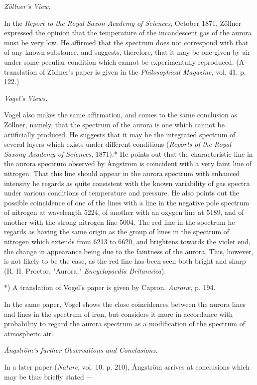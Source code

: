\documentclass[a4paper, 12pt, oneside, polutonikogreek, english]{article}
\begin{document}
\emph{Zöllner's View.}

In the \emph{Report to the Royal Saxon Academy of Sciences}, October 1871, Zöllner expressed the opinion that the temperature of the incandescent gas of the aurora must be very low. He affirmed that the spectrum does not correspond with that of any known substance, and suggests, therefore, that it may be one given by air under some peculiar condition which cannot be experimentally reproduced. (A translation of Zöllner's paper is given in the \emph{Philosophical Magazine}, vol. 41. p. 122.)

\emph{Vogel's Views.}

Vogel also makes the same affirmation, and comes to the same conclusion as Zöllner, namely, that the spectrum of the aurora is one which cannot be artificially produced. He suggests that it may be the integrated spectrum of several layers which exists under different conditions (\emph{Reports of the Royal Saxony Academy of Sciences}, 1871).* He points out that the characteristic line in the aurora spectrum observed by Ångström is coincident with a very faint line of nitrogen. That this line should appear in the aurora spectrum with enhanced intensity he regards as quite consistent with the known variability of gas spectra under various conditions of temperature and pressure. He also points out the possible coincidence of one of the lines with a line in the negative pole spectrum of nitrogen at wavelength 5224, of another with an oxygen line at 5189, and of another with the strong nitrogen line 5004. The red line in the spectrum he regards as having the same origin as the group of lines in the spectrum of nitrogen which extends from 6213 to 6620, and brightens towards the violet end, the change in appearance being due to the faintness of the aurora. This, however, is not likely to be the case, as the red line has been seen both bright and sharp (R. H. Proctor, "Aurora," \emph{Encyclopaedia Britannica}).

*) A translation of Vogel's paper is given by Capron, \emph{Auroræ}, p. 194.

In the same paper, Vogel shows the close coincidences between the aurora lines and lines in the spectrum of iron, but considers it more in accordance with probability to regard the aurora spectrum as a modification of the spectrum of atmospheric air.

\emph{Ångström's further Observations and Conclusions.}

In a later paper (\emph{Nature}, vol. 10. p. 210), Ångström arrives at conclusions which may be thus briefly stated ---
\end{document}
